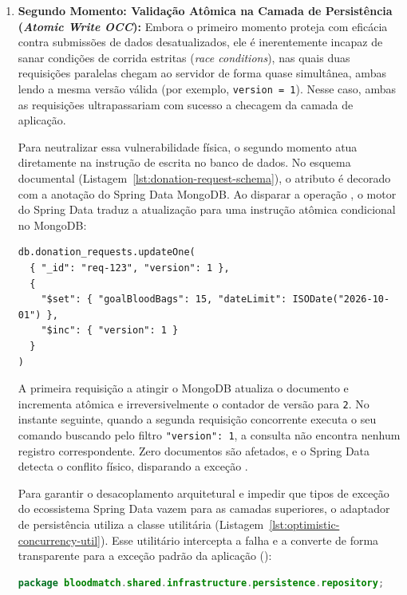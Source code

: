 \begin{enumerate}[leftmargin=*]
  \item \textbf{Segundo Momento: Validação Atômica na Camada de Persistência (\textit{Atomic Write OCC}):}
  Embora o primeiro momento proteja com eficácia contra submissões de dados desatualizados, ele é inerentemente incapaz de sanar condições de corrida estritas (\textit{race conditions}), nas quais duas requisições paralelas chegam ao servidor de forma quase simultânea, ambas lendo a mesma versão válida (por exemplo, \texttt{version = 1}). Nesse caso, ambas as requisições ultrapassariam com sucesso a checagem da camada de aplicação.
  
  Para neutralizar essa vulnerabilidade física, o segundo momento atua diretamente na instrução de escrita no banco de dados. No esquema documental  (Listagem~\ref{lst:donation-request-schema}), o atributo  é decorado com a anotação  do Spring Data MongoDB. Ao disparar a operação , o motor do Spring Data traduz a atualização para uma instrução atômica condicional no MongoDB:
  \begin{lstlisting}
db.donation_requests.updateOne(
  { "_id": "req-123", "version": 1 },
  { 
    "$set": { "goalBloodBags": 15, "dateLimit": ISODate("2026-10-01") },
    "$inc": { "version": 1 }
  }
)
  \end{lstlisting}
  A primeira requisição a atingir o MongoDB atualiza o documento e incrementa atômica e irreversivelmente o contador de versão para \texttt{2}. No instante seguinte, quando a segunda requisição concorrente executa o seu comando buscando pelo filtro \texttt{"version": 1}, a consulta não encontra nenhum registro correspondente. Zero documentos são afetados, e o Spring Data detecta o conflito físico, disparando a exceção .
  
  Para garantir o desacoplamento arquitetural e impedir que tipos de exceção do ecossistema Spring Data vazem para as camadas superiores, o adaptador de persistência utiliza a classe utilitária  (Listagem~\ref{lst:optimistic-concurrency-util}). Esse utilitário intercepta a falha e a converte de forma transparente para a exceção padrão da aplicação ():

\begin{lstlisting}[language=Java, caption={Isolamento de Concorrência Otimista na Infraestrutura}, label={lst:optimistic-concurrency-util}]
package bloodmatch.shared.infrastructure.persistence.repository;


\end{lstlisting}
\end{enumerate}
